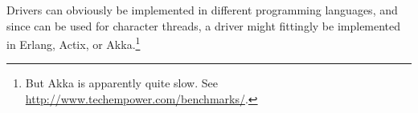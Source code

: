 Drivers can obviously be implemented in different programming
languages, and since
 can be used
for character threads, a driver might fittingly be
implemented in Erlang, Actix, or Akka.\footnote{But Akka is apparently
quite slow. See \url{http://www.techempower.com/benchmarks/}.}


